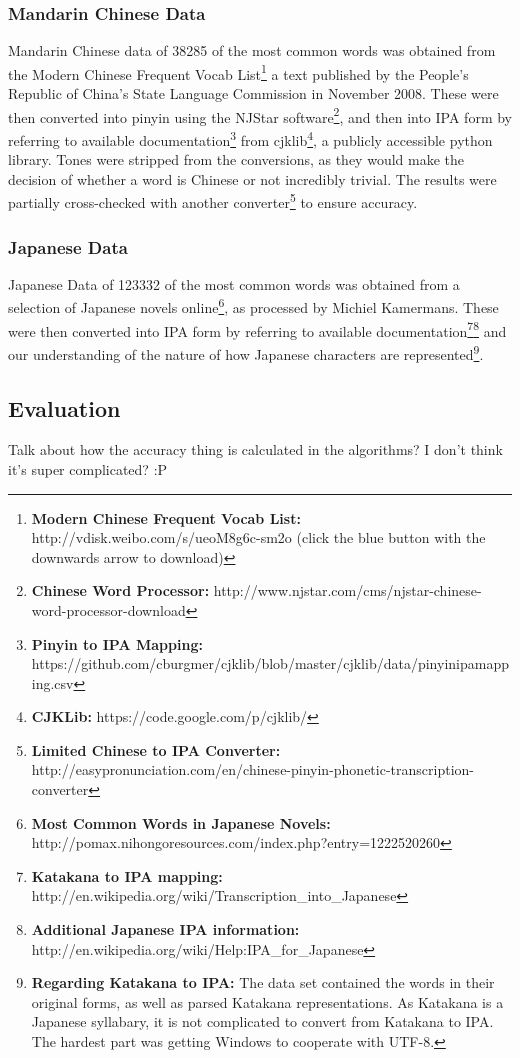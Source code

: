 \documentclass{paper}
\begin{document}
\subsubsection{Mandarin Chinese Data}
Mandarin Chinese data of 38285 of the most common words was obtained from the Modern Chinese Frequent Vocab List\footnote{\textbf{Modern Chinese Frequent Vocab List: }http://vdisk.weibo.com/s/ueoM8g6c-sm2o (click the blue button with the downwards arrow to download)} a text published by the People's Republic of China's State Language Commission in November 2008. These were then converted into pinyin using the NJStar software\footnote{\textbf{Chinese Word Processor: }http://www.njstar.com/cms/njstar-chinese-word-processor-download}, and then into IPA form by referring to available documentation\footnote{\textbf{Pinyin to IPA Mapping:} https://github.com/cburgmer/cjklib/blob/master/cjklib/data/pinyinipamapping.csv} from cjklib\footnote{\textbf{CJKLib: }https://code.google.com/p/cjklib/}, a publicly accessible python library. Tones were stripped from the conversions, as they would make the decision of whether a word is Chinese or not incredibly trivial. The results were partially cross-checked with another converter\footnote{\textbf{Limited Chinese to IPA Converter: }http://easypronunciation.com/en/chinese-pinyin-phonetic-transcription-converter} to ensure accuracy.
\subsubsection{Japanese Data}
Japanese Data of 123332 of the most common words was obtained from a selection of Japanese novels online\footnote{\textbf{Most Common Words in Japanese Novels:} http://pomax.nihongoresources.com/index.php?entry=1222520260}, as processed by Michiel Kamermans. These were then converted into IPA form by referring to available documentation\footnote{\textbf{Katakana to IPA mapping: }http://en.wikipedia.org/wiki/Transcription\_into\_Japanese}\footnote{\textbf{Additional Japanese IPA information: }http://en.wikipedia.org/wiki/Help:IPA\_for\_Japanese} and our understanding of the nature of how Japanese characters are represented\footnote{\textbf{Regarding Katakana to IPA: }The data set contained the words in their original forms, as well as parsed Katakana representations. As Katakana is a Japanese syllabary, it is not complicated to convert from Katakana to IPA. The hardest part was getting Windows to cooperate with UTF-8.}. 
\subsection{Evaluation}
Talk about how the accuracy thing is calculated in the algorithms? I don't think it's super complicated? :P
\end{document}
